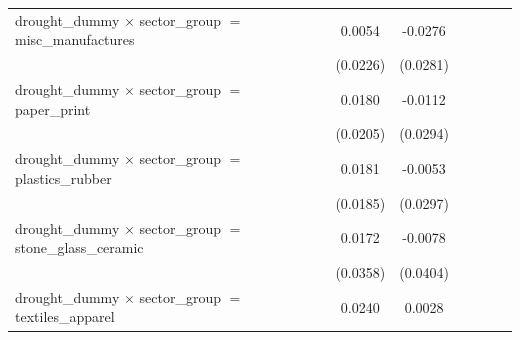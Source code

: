 \begin{tabular}{lcccccccc}
   drought\_dummy $\times$ sector\_group $=$ misc\_manufactures                   &                       &                       & 0.0054                & -0.0276               &                       &                       &                       &   \\   
                                                                                  &                       &                       & (0.0226)              & (0.0281)              &                       &                       &                       &   \\   
   drought\_dummy $\times$ sector\_group $=$ paper\_print                         &                       &                       & 0.0180                & -0.0112               &                       &                       &                       &   \\   
                                                                                  &                       &                       & (0.0205)              & (0.0294)              &                       &                       &                       &   \\   
   drought\_dummy $\times$ sector\_group $=$ plastics\_rubber                     &                       &                       & 0.0181                & -0.0053               &                       &                       &                       &   \\   
                                                                                  &                       &                       & (0.0185)              & (0.0297)              &                       &                       &                       &   \\   
   drought\_dummy $\times$ sector\_group $=$ stone\_glass\_ceramic                &                       &                       & 0.0172                & -0.0078               &                       &                       &                       &   \\   
                                                                                  &                       &                       & (0.0358)              & (0.0404)              &                       &                       &                       &   \\   
   drought\_dummy $\times$ sector\_group $=$ textiles\_apparel                    &                       &                       & 0.0240                & 0.0028                &                       &                       &                       &   \\   

\end{tabular}
